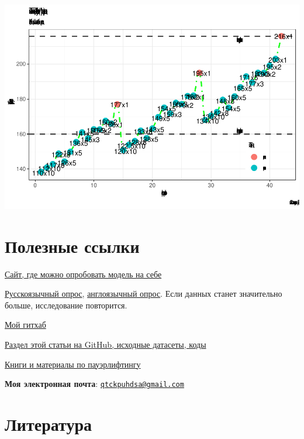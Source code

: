 \documentclass[
]{article}
\begin{document}
\begin{center}\includegraphics[width=0.95\linewidth]{Regression-model-for-estimating-RM_files/figure-latex/unnamed-chunk-59-2} \end{center}

\hypertarget{ux43fux43eux43bux435ux437ux43dux44bux435-ux441ux441ux44bux43bux43aux438}{%
\section{Полезные
ссылки}\label{ux43fux43eux43bux435ux437ux43dux44bux435-ux441ux441ux44bux43bux43aux438}}

\href{https://dmitrypasko.shinyapps.io/RMbyMRMestimating/}{Сайт, где
можно опробовать модель на себе}

\href{https://forms.gle/e428M7osMCA98ANV9}{Русскоязычный опрос},
\href{https://forms.gle/kbwqQtq8vWpKdJbH8}{англоязычный опрос}. Если
данных станет значительно больше, исследование повторится.

\href{https://github.com/PasaOpasen}{Мой гитхаб}

\href{https://github.com/PasaOpasen/Powerlifting-training-diary-and-articles/tree/master/Estimating\%20RM}{Раздел
этой статьи на GitHub, исходные датасеты, коды}

\href{https://github.com/PasaOpasen/Powerlifting-training-diary-and-articles/tree/master/Материалы\%20по\%20пауэрлифтингу\%20и\%20не\%20только}{Книги
и материалы по пауэрлифтингу}

\textbf{Моя электронная почта}:
\href{mailto:qtckpuhdsa@gmail.com}{\nolinkurl{qtckpuhdsa@gmail.com}}

\hypertarget{ux43bux438ux442ux435ux440ux430ux442ux443ux440ux430}{%
\section{Литература}\label{ux43bux438ux442ux435ux440ux430ux442ux443ux440ux430}}
\end{document}
